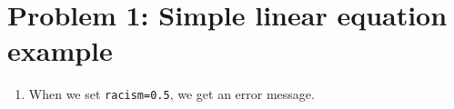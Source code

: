 \section*{Problem 1: Simple linear equation example}
\begin{enumerate}
\item 
When we set \texttt{racism=0.5}, we get an error message.
\end{enumerate}
